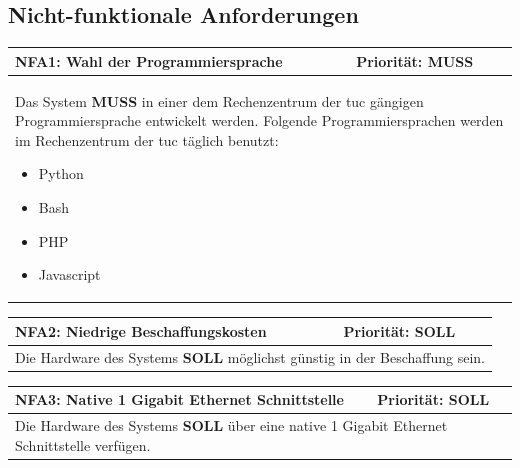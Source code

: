 \documentclass[titlepage]{report}
\begin{document}
\subsection*{Nicht-funktionale Anforderungen}
\begin{center}
\begin{tabular}{p{}>{\raggedleft\arraybackslash}p{}}\toprule
    \textbf{NFA1: Wahl der Programmiersprache} & \textbf{Priorität: MUSS} \\\midrule
	\multicolumn{2}{p{\textwidth-\tabcolsep}}{%
        Das System \textbf{MUSS} in einer dem Rechenzentrum der
        \gls{tuc} gängigen Programmiersprache entwickelt werden.
        Folgende Programmiersprachen werden im Rechenzentrum der
        \gls{tuc} täglich benutzt:
        \begin{itemize}
            \item Python
            \item Bash
            \item PHP
            \item Javascript
        \end{itemize}
    }\\\bottomrule
\end{tabular}
\end{center}
\begin{center}
\begin{tabular}{p{}>{\raggedleft\arraybackslash}p{}}\toprule
    \textbf{NFA2: Niedrige Beschaffungskosten} & \textbf{Priorität: SOLL} \\\midrule
	\multicolumn{2}{p{\textwidth-\tabcolsep}}{%
    Die Hardware des Systems \textbf{SOLL} möglichst günstig in der Beschaffung
    sein.
    }\\\bottomrule
\end{tabular}
\end{center}
\begin{center}
\begin{tabular}{p{}>{\raggedleft\arraybackslash}p{}}\toprule
    \textbf{NFA3: Native 1 Gigabit Ethernet Schnittstelle} & \textbf{Priorität: SOLL} \\\midrule
	\multicolumn{2}{p{\textwidth-\tabcolsep}}{%
    Die Hardware des Systems \textbf{SOLL} über eine native 1 Gigabit
    Ethernet Schnittstelle verfügen.
    }\\\bottomrule
\end{tabular}
\end{center}
\end{document}
